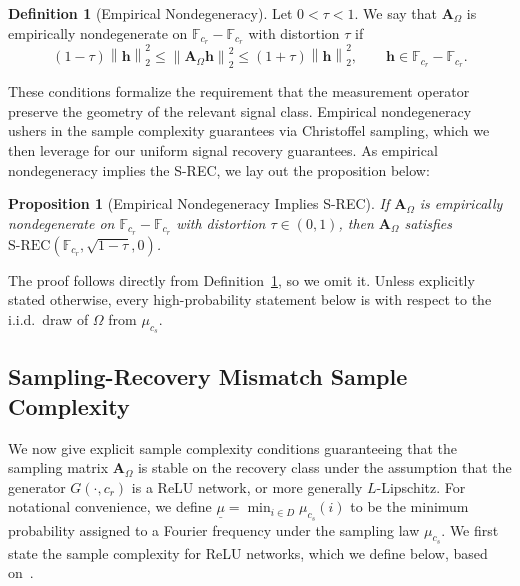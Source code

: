 \documentclass{article}
\theoremstyle{plain}
\newtheorem{proposition}[theorem]{Proposition}
\theoremstyle{definition}
\newtheorem{definition}[theorem]{Definition}
\theoremstyle{remark}
\begin{document}
\begin{definition}[Empirical Nondegeneracy]\label{def:empirical-nondegeneracy}
  Let $0<\tau<1$. We say that $\mathbf A_\Omega$ is empirically nondegenerate on $\mathbb{F}_{c_r}-\mathbb{F}_{c_r}$ with distortion $\tau$ if
  \[
    \left(1-\tau\right)\left\|\mathbf h\right\|_2^2
    \leq
    \left\|\mathbf A_\Omega \mathbf h\right\|_2^2
    \leq
    \left(1+\tau\right)\left\|\mathbf h\right\|_2^2,
    \qquad
    \mathbf h\in \mathbb{F}_{c_r}-\mathbb{F}_{c_r}.
  \]
\end{definition}

These conditions formalize the requirement that the measurement operator preserve the geometry of the relevant signal class. Empirical nondegeneracy ushers in the sample complexity guarantees via Christoffel sampling, which we then leverage for our uniform signal recovery guarantees. As empirical nondegeneracy implies the S-REC, we lay out the proposition below: 

\begin{proposition}[Empirical Nondegeneracy Implies S-REC]\label{prop: end implies srec}
  If $\mathbf A_\Omega$ is empirically nondegenerate on $\mathbb{F}_{c_r}-\mathbb{F}_{c_r}$ with distortion $\tau\in(0,1)$, then $
    \mathbf A_\Omega$ satisfies $ \mathrm{S\text{-}REC}\left(\mathbb{F}_{c_r},\sqrt{1-\tau},0\right)$.
\end{proposition}

The proof follows directly from Definition~\ref{def:empirical-nondegeneracy}, so we omit it. Unless explicitly stated otherwise, every high-probability statement below is with respect to the i.i.d.\ draw of $\Omega$ from $\mu_{c_s}$.

\subsection{Sampling-Recovery Mismatch Sample Complexity}
We now give explicit sample complexity conditions guaranteeing that the sampling matrix $\mathbf A_\Omega$ is stable on the recovery class under the assumption that the generator $G(\cdot, c_r)$ is a ReLU network, or more generally $L$-Lipschitz. For notational convenience, we define
$
  \underline{\mu}
  =
  \min_{i \in D}\mu_{c_s}\left(i\right)
$
to be the minimum probability assigned to a Fourier frequency under the sampling law $\mu_{c_s}$. We first state the sample complexity for ReLU networks, which we define below, based on~\cite[Definition 2]{berk2022fourier}.
\end{document}
